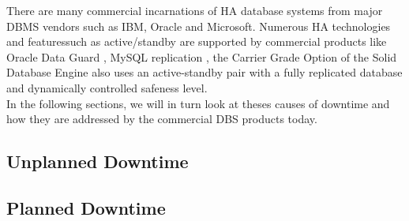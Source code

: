 \documentclass[english]{tktltiki2}
\theoremstyle{definition}
\theoremstyle{remark}
\begin{document}
There are many commercial incarnations of HA database systems from major DBMS vendors such as IBM, Oracle and Microsoft.
Numerous HA technologies and featuressuch as active/standby are supported by commercial products like Oracle Data Guard \cite{Oracle}, MySQL replication \cite{MySQL2}, the Carrier Grade Option of the Solid Database Engine \cite{AHUG} also uses an active-standby pair with a fully replicated database and dynamically controlled safeness level.\\
In the following sections, we will in turn look at theses causes of downtime and how they are addressed by the commercial DBS products today. 



\subsection{Unplanned Downtime}

\subsection{Planned Downtime}
\pagebreak
\end{document}
